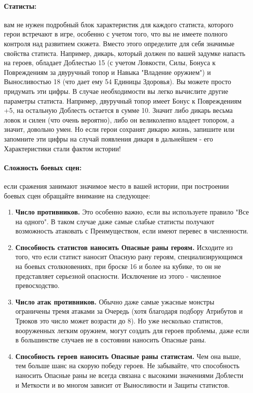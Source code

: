 \paragraph{Статисты:} вам не нужен подробный блок характеристик для каждого статиста, которого герои встречают в игре, особенно с учетом того, что вы не имеете полного контроля над развитием сюжета. Вместо этого определите для себя значимые свойства статиста. Например, дикарь, который должен по вашей задумке напасть на героев, обладает Доблестью 15 (с учетом Ловкости, Силы, Бонуса к Повреждениям за двуручный топор и Навыка "Владение оружием") и Выносливостью 18 (что дает ему 54 Единицы Здоровья). Вы можете просто придумать эти цифры. В случае необходимости вы легко вычислите другие параметры статиста. Например, двуручный топор имеет Бонус к Повреждениям +5, на остальную Доблесть остается в сумме 10. Значит либо дикарь весьма ловок и силен (что очень вероятно), либо он великолепно владеет топором, а значит, довольно умен. Но если герои сохранят дикарю жизнь, запишите или запомните эти цифры на случай появления дикаря в дальнейшем - его Характеристики стали фактом истории!
\paragraph{Сложность боевых сцен:} если сражения занимают значимое место в вашей истории, при построении боевых сцен обращайте внимание на следующее:
\begin{enumerate}
\item \textbf{Число противников.} Это особенно важно, если вы используете правило "Все на одного". В таком случае даже самые слабые статисты получают возможность атаковать с Преимуществом, если имеют перевес в численности.
\item \textbf{Способность статистов наносить Опасные раны героям.} Исходите из того, что если статист наносит Опасную рану героям, специализирующимся на боевых столкновениях, при броске 16 и более на кубике, то он не представляет серьезной опасности.
Исключение из этого - численное превосходство.
\item \textbf{Число атак противников.} Обычно даже самые ужасные монстры ограничены тремя атаками за Очередь (хотя благодаря подбору Атрибутов и Трюков это число может возрасти до 8). Но уже несколько статистов, вооруженных легким оружием, могут создать для героев проблемы, даже если в большинстве случаев не в состоянии наносить Опасные раны.
\item \textbf{Способность героев наносить Опасные раны статистам.} Чем она выше, тем больше шанс на скорую победу героев. Не забывайте, что способность наносить Опасные раны не всегда связана с высокими значениями Доблести и Меткости и во многом зависит от Выносливости и Защиты статистов.
\end{enumerate}